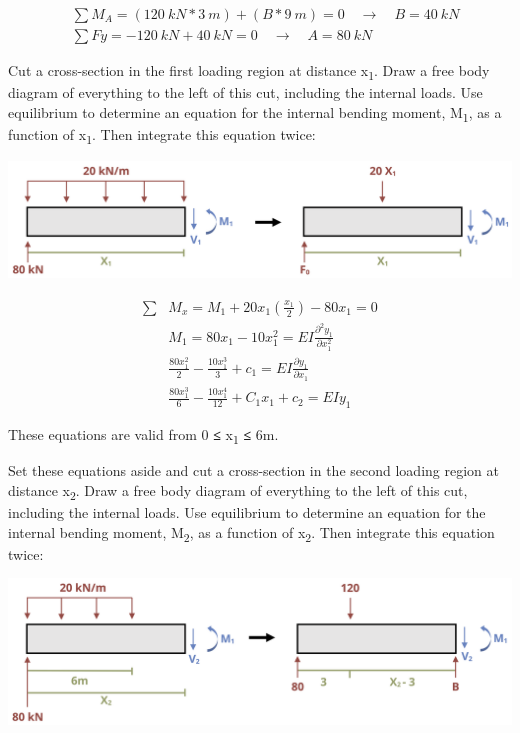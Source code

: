 \documentclass[
  letterpaper,
  DIV=11,
  numbers=noendperiod]{scrreprt}
\theoremstyle{definition}
\theoremstyle{remark}
\begin{document}
\begin{tcolorbox}
\begin{tcolorbox}
\[
\begin{aligned}
& \sum M_A=(120{~kN}*3{~m})+(B*9{~m})=0 \quad \rightarrow \quad B=40{~kN} \\
& \sum F y=-120{~kN}+40{~kN}=0 \quad \rightarrow \quad A=80{~kN}
\end{aligned}
\]

Cut a cross-section in the first loading region at distance
x\textsubscript{1}. Draw a free body diagram of everything to the left
of this cut, including the internal loads. Use equilibrium to determine
an equation for the internal bending moment, M\textsubscript{1}, as a
function of x\textsubscript{1}. Then integrate this equation twice:

\begin{center}
\includegraphics{images/CH11 PNGs/example11.3-3.png}
\end{center}

\[
\begin{aligned}
\sum &M_x=M_1+20 x_1\left(\frac{x_1}{2}\right)-80 x_1=0 \\
&M_1=80 x_1-10 x_1^2=E I \frac{\partial^2 y_1}{\partial x_1^2} \\ 
&\frac{80 x_1^2}{2}-\frac{10 x_1^3}{3}+c_1=E I \frac{\partial y_1}{\partial x_1} \\
&\frac{80 x_1^3}{6}-\frac{10 x_1^4}{12}+C_1 x_1+c_2=E I y_1
\end{aligned}
\]

These equations are valid from 0 \textbf{≤} x\textsubscript{1}
\textbf{≤} 6m.

Set these equations aside and cut a cross-section in the second loading
region at distance x\textsubscript{2}. Draw a free body diagram of
everything to the left of this cut, including the internal loads. Use
equilibrium to determine an equation for the internal bending moment,
M\textsubscript{2}, as a function of x\textsubscript{2}. Then integrate
this equation twice:

\begin{center}
\includegraphics{images/CH11 PNGs/example11.3-4.png}
\end{center}


\end{tcolorbox}
\end{tcolorbox}
\end{document}
